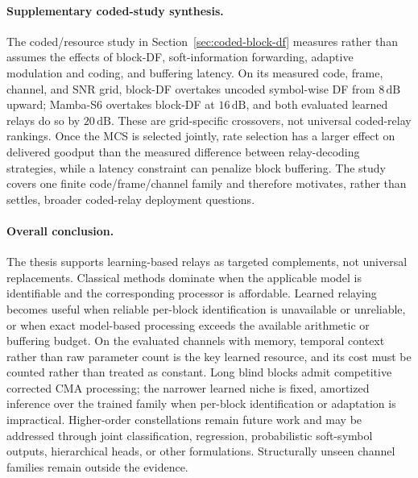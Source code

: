 \paragraph{Supplementary coded-study synthesis.}
The coded/resource study in Section~\ref{sec:coded-block-df} measures rather
than assumes the effects of block-DF, soft-information forwarding, adaptive
modulation and coding, and buffering latency.  On its measured code, frame,
channel, and SNR grid, block-DF overtakes uncoded symbol-wise DF from
\(8\,\mathrm{dB}\) upward; Mamba-S6 overtakes block-DF at \(16\,\mathrm{dB}\),
and both evaluated learned relays do so by \(20\,\mathrm{dB}\).  These are
grid-specific crossovers, not universal coded-relay rankings.  Once the MCS
is selected jointly, rate selection has a larger effect on delivered
goodput than the measured difference between relay-decoding strategies,
while a latency constraint can penalize block buffering.  The study covers
one finite code/frame/channel family and therefore motivates, rather than
settles, broader coded-relay deployment questions.

\paragraph{Overall conclusion.}
The thesis supports learning-based relays as targeted complements, not
universal replacements.  Classical methods dominate when the applicable
model is identifiable and the corresponding processor is affordable.
Learned relaying becomes useful when reliable per-block identification is
unavailable or unreliable, or when exact model-based processing exceeds the
available arithmetic or buffering budget.  On the evaluated channels with
memory, temporal context rather than raw parameter count is the key learned
resource, and its cost must be counted rather than treated as constant.
Long blind blocks admit competitive corrected CMA processing; the narrower
learned niche is fixed, amortized inference over the trained family when
per-block identification or adaptation is impractical.  Higher-order
constellations remain future work and may be addressed through joint
classification, regression, probabilistic soft-symbol outputs, hierarchical
heads, or other formulations.  Structurally unseen channel families remain
outside the evidence.